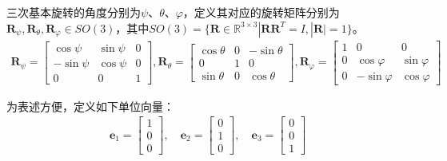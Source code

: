 三次基本旋转的角度分别为$\psi$、$\theta$、$\varphi$，定义其对应的旋转矩阵分别为$\boldsymbol{R}_\psi,\boldsymbol{R}_\theta,\boldsymbol{R}_\varphi\in{SO(3)}$，其中$SO(3)=\{\boldsymbol{R}\in\mathbb{R}^{3\times3}|\boldsymbol{R}\boldsymbol{R}^T=I,|\boldsymbol{R}|=1\}$。
\begin{equation}
    \begin{aligned} %
\boldsymbol{R}_\psi=\begin{bmatrix}\cos\psi & \sin\psi & 0 \\-\sin\psi & \cos\psi & 0 \\0 & 0 & 1\end{bmatrix},\boldsymbol{R}_\theta=\begin{bmatrix}\cos\theta & 0 & -\sin\theta \\0 & 1 & 0 \\\sin\theta & 0 & \cos\theta\end{bmatrix},\boldsymbol{R}_\varphi=\begin{bmatrix}1 & 0 & 0\\0 & \cos\varphi & \sin\varphi \\0 & -\sin\varphi & \cos\varphi\end{bmatrix}\label{eq_1}
    \end{aligned}
\end{equation}

为表述方便，定义如下单位向量：
\begin{equation}
    \begin{aligned}
\boldsymbol{e}_1=\begin{bmatrix}1 \\0 \\0\end{bmatrix},
\quad\boldsymbol{e}_2=\begin{bmatrix}0 \\1 \\0\end{bmatrix},
\quad\boldsymbol{e}_3=\begin{bmatrix}0 \\0 \\1\end{bmatrix}\label{eq_2}
    \end{aligned}
\end{equation}

